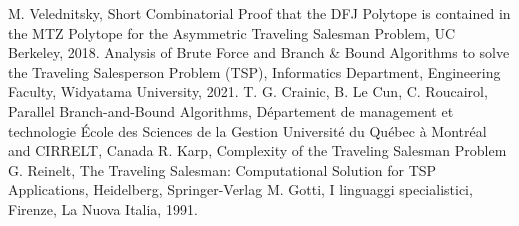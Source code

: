 \documentclass[a4paper,12pt]{report}
\begin{document}
%
%

%
%

\begin{thebibliography}{00}
M. Velednitsky, Short Combinatorial Proof that the DFJ Polytope is contained in
the MTZ Polytope for the Asymmetric Traveling Salesman Problem, UC Berkeley, 2018.
%
Analysis of Brute Force and Branch \& Bound Algorithms to solve the Traveling
Salesperson Problem (TSP), Informatics Department, Engineering Faculty, Widyatama University, 2021.
%
T. G. Crainic, B. Le Cun, C. Roucairol, Parallel Branch-and-Bound Algorithms, Département de management et technologie École des Sciences de la Gestion Université du Québec à Montréal and CIRRELT, Canada
%
R. Karp, Complexity of the Traveling Salesman Problem
%
G. Reinelt, The Traveling Salesman: Computational Solution for TSP Applications, Heidelberg, Springer-Verlag
%
M. Gotti, I linguaggi specialistici, Firenze, La Nuova Italia, 1991.
\end{thebibliography}
% 
\end{document}
